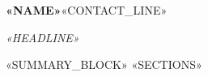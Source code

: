 \documentclass[10.5pt]{article}
\begin{document}
{\bfseries\LARGE\color{accent} «NAME»}\hfill{\small «CONTACT_LINE»}\par
\vspace{1pt}
{\itshape «HEADLINE»}\par\vspace{3pt}
«SUMMARY_BLOCK»
«SECTIONS»
\end{document}
